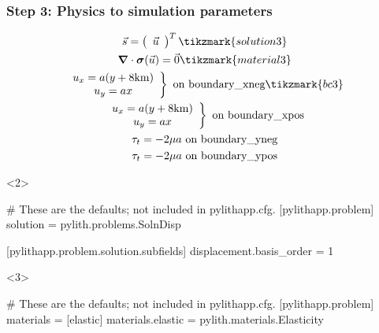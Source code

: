 \documentclass[aspectratio=169]{beamer}
\begin{document}
\begin{frame}[t,fragile]
  \frametitle{Step 3: Physics to simulation parameters}
  \summary{}

  \begin{minipage}[t]{0.35\textwidth}
    {\scriptsize
    \begin{gather*}
      \vec{s} = \left(\begin{array}{c} \vec{u} \end{array}\right)^T \tikzmark{solution3}\\
      \boldsymbol{\nabla} \cdot \boldsymbol{\sigma}(\vec{u}) = \vec{0} \tikzmark{material3}\\
      \left. \begin{array}{c} u_x = a(y+8\mathrm{km}) \\ u_y = ax \end{array}\right\} \text{ on boundary\_xneg} \tikzmark{bc3} \\
      \left. \begin{array}{c} u_x = a(y+8\mathrm{km}) \\ u_y = ax \end{array}\right\} \text{ on boundary\_xpos} \\
      \tau_t = -2\mu a \text{ on boundary\_yneg} \\
      \tau_t = -2\mu a \text{ on boundary\_ypos}
    \end{gather*}}
  \end{minipage}
  \hfill
  \begin{minipage}[t]{0.60\textwidth}
    \begin{onlyenv}<2>
      \begin{cfgcode}
        # These are the defaults; not included in pylithapp.cfg.
        [pylithapp.problem]
        solution = pylith.problems.SolnDisp
        
        [pylithapp.problem.solution.subfields]
        displacement.basis_order = 1
      \end{cfgcode}
    \end{onlyenv}
    \begin{onlyenv}<3>
      \begin{cfgcode}
        # These are the defaults; not included in pylithapp.cfg.
        [pylithapp.problem]
        materials = [elastic]
        materials.elastic = pylith.materials.Elasticity


\end{cfgcode}
\end{onlyenv}
\end{minipage}
\end{frame}
\end{document}
